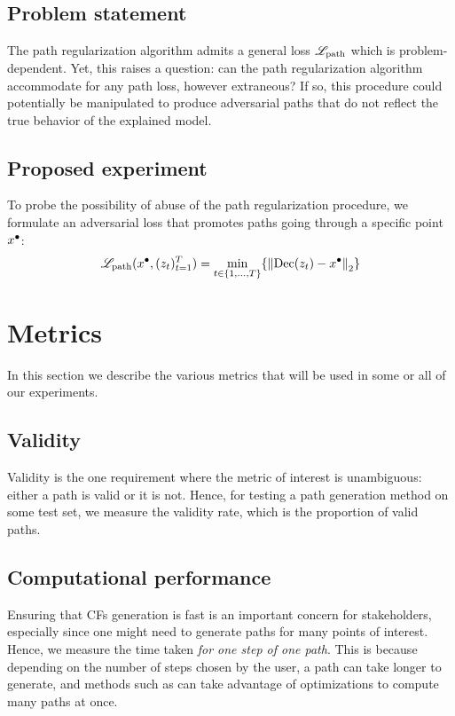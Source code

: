 \documentclass[../main.tex]{subfiles}
\begin{document}
\subsection{Problem statement}

The path regularization algorithm admits a general loss $\mathscr{L}_\text{path}$ which is problem-dependent.
Yet, this raises a question: can the path regularization algorithm accommodate for any path loss, however extraneous?
If so, this procedure could potentially be manipulated to produce adversarial paths that do not reflect the true behavior of the explained model.

\subsection{Proposed experiment}

To probe the possibility of abuse of the path regularization procedure, we formulate an adversarial loss that promotes paths going through a specific point $x^\bullet$:
\begin{align}
    \mathscr{L}_\text{path}(x^\bullet, (z_t)_{t=1}^T) = \min_{t \in \{1, \ldots, T\}} \{ \left\lVert\operatorname{Dec}(z_t) - x^\bullet\right\rVert_2 \}
\end{align}

\section{Metrics}

In this section we describe the various metrics that will be used in some or all of our experiments.

\subsection{Validity}

Validity is the one requirement where the metric of interest is unambiguous: either a path is valid or it is not.
Hence, for testing a path generation method on some test set, we measure the validity rate, which is the proportion of valid paths.

\subsection{Computational performance}

Ensuring that CFs generation is fast is an important concern for stakeholders, especially since one might need to generate paths for many points of interest.
Hence, we measure the time taken \emph{for one step of one path}.
This is because depending on the number of steps chosen by the user, a path can take longer to generate, and methods such as \ls{} can take advantage of optimizations to compute many paths at once.
\end{document}
